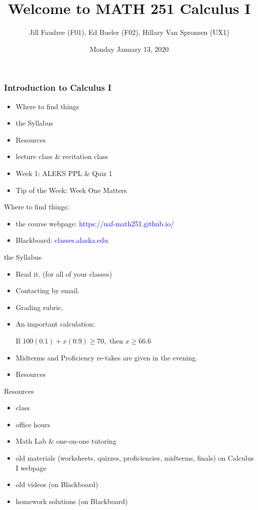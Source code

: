 \documentclass{beamer}
\title{Welcome to MATH 251 Calculus I}
\subtitle{}
\author{Jill Faudree (F01), Ed Bueler (F02), Hillary Van Spronsen (UX1)}
\date{Monday January 13, 2020}
\begin{document}
 \begin{frame}
\titlepage
\end{frame}


\begin{frame}
\frametitle{Introduction to Calculus I}
\begin{itemize}
\item Where to find things
\item the Syllabus
\item Resources
\item lecture class \& recitation class
\item Week 1: ALEKS PPL \& Quiz 1
\item Tip of the Week: Week One Matters
\end{itemize}
\end{frame}

\begin{frame}
Where to find things:
	\begin{itemize}
	\item the course webpage: \textcolor{blue}{https://uaf-math251.github.io/}
	\item Blackboard: \textcolor{blue}{classes.alaska.edu}
	\end{itemize}
\end{frame}

\begin{frame}
the Syllabus
	\begin{itemize}
	\item Read it. (for all of your classes)
	\item Contacting by email.
	\item Grading rubric.
	\item An important calculation:
	
	\begin{center} If $100(0.1) + x(0.9)\geq 70,$ then 
	$x \geq 66.6$ \end{center}
	\item Midterms and Proficiency re-takes are given in the evening. 
	\item Resources
	\end{itemize}
\end{frame}

\begin{frame}
	Resources
	\begin{itemize}
	\item class 
	\item office hours
	\item Math Lab \& one-on-one tutoring
	\item old materials (worksheets, quizzes, proficiencies, midterms, finals) on Calculus I webpage
	\item old videos (on Blackboard)
	\item homework solutions (on Blackboard)
	\end{itemize}
\end{frame}
\end{document}
